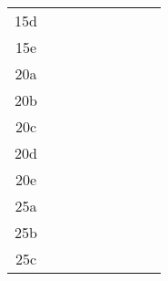 \documentclass[12pt]{article}
\begin{document}
\begin{sidewaystable}[h]
\begin{tabular}{|c|c|c||c|c||c|c||c|c|}
15d & \hspace{1.7cm} & & \hspace{1.7cm} & & \hspace{1.7cm} & & \hspace{1.7cm} & \\
15e & \hspace{1.7cm} & & \hspace{1.7cm} & & \hspace{1.7cm} & & \hspace{1.7cm} & \\
\hline
20a & \hspace{1.7cm} & & \hspace{1.7cm} & & \hspace{1.7cm} & & \hspace{1.7cm} & \\
20b & \hspace{1.7cm} & & \hspace{1.7cm} & & \hspace{1.7cm} & & \hspace{1.7cm} & \\
20c & \hspace{1.7cm} & & \hspace{1.7cm} & & \hspace{1.7cm} & & \hspace{1.7cm} & \\
20d & \hspace{1.7cm} & & \hspace{1.7cm} & & \hspace{1.7cm} & & \hspace{1.7cm} & \\
20e & \hspace{1.7cm} & & \hspace{1.7cm} & & \hspace{1.7cm} & & \hspace{1.7cm} & \\
\hline
25a & \hspace{1.7cm} & & \hspace{1.7cm} & & \hspace{1.7cm} & & \hspace{1.7cm} & \\
25b & \hspace{1.7cm} & & \hspace{1.7cm} & & \hspace{1.7cm} & & \hspace{1.7cm} & \\
25c & \hspace{1.7cm} & & \hspace{1.7cm} & & \hspace{1.7cm} & & \hspace{1.7cm} & \\

\end{tabular}
\end{sidewaystable}
\end{document}
